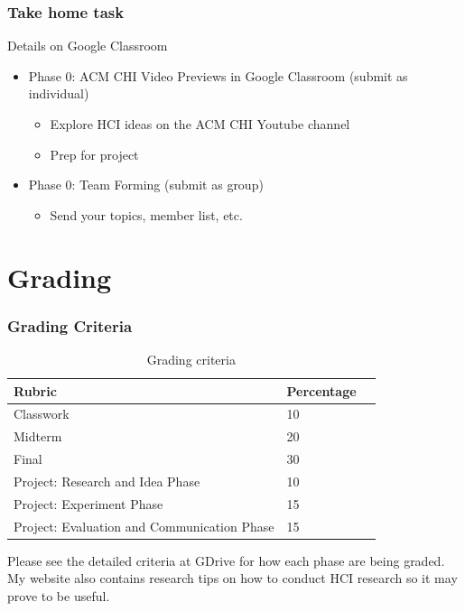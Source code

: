 \documentclass{beamer}
\begin{document}
\begin{frame}
\frametitle{Take home task}
Details on Google Classroom
\begin{itemize}
	\item Phase 0: ACM CHI Video Previews in Google Classroom (submit as individual)
	\begin{itemize}
		\item Explore HCI ideas on the ACM CHI Youtube channel
		\item Prep for project 
	\end{itemize}
	\item Phase 0: Team Forming (submit as group)
	\begin{itemize}
		\item Send your topics, member list, etc. 
	\end{itemize}
\end{itemize}
\end{frame}

\section{Grading} %

\begin{frame}
\frametitle{Grading Criteria}
\begin{table}
	\begin{tabular}{l l l}
		\toprule
		\textbf{Rubric} & \textbf{Percentage} \\
		\midrule
		Classwork & 10 \\
		Midterm & 20 \\
		Final & 30 \\
		Project: Research and Idea Phase & 10 \\
		Project: Experiment Phase & 15 \\
		Project: Evaluation and Communication Phase & 15 \\
		\bottomrule
	\end{tabular}
	\caption{Grading criteria}
\end{table}
Please see the detailed criteria at GDrive for how each phase are being graded.  My website also contains research tips on how to conduct HCI research so it may prove to be useful.
\end{frame}
\end{document}
